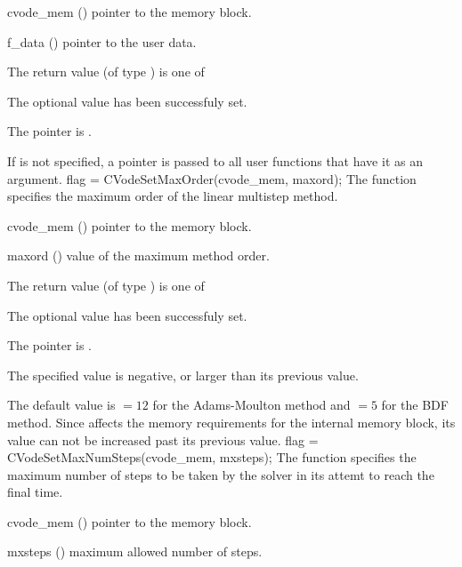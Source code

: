 {
  \begin{args}
  \item[cvode\_mem] ()
    pointer to the {\cvode} memory block.
  \item[f\_data] ()
    pointer to the user data.
  \end{args}
}
{
  The return value  (of type ) is one of
  \begin{args}
  \item[\Id{SUCCESS}] 
    The optional value has been successfuly set.
  \item[\Id{CVS\_NO\_MEM}]
    The  pointer is .
  \end{args}
}
{
  If  is not specified, a  pointer is
  passed to all user functions that have it as an argument.
}
{
flag = CVodeSetMaxOrder(cvode\_mem, maxord);
}
{
  The function  specifies the maximum order of the 
  linear multistep method.
}
{
  \begin{args}
  \item[cvode\_mem] ()
    pointer to the {\cvode} memory block.
  \item[maxord] ()
    value of the maximum method order.
  \end{args}
}
{
  The return value  (of type ) is one of
  \begin{args}
  \item[\Id{SUCCESS}] 
    The optional value has been successfuly set.
  \item[\Id{CVS\_NO\_MEM}]
    The  pointer is .
  \item[\Id{CVS\_ILL\_INPUT}]
    The specified value  is negative, or larger than 
    its previous value.
  \end{args}
}
{
  The default value is $= 12$ for
  the Adams-Moulton method and $= 5$
  for the BDF method.
  Since  affects the memory requirements
  for the internal {\cvode} memory block, its value
  can not be increased past its previous value.
}
{
flag = CVodeSetMaxNumSteps(cvode\_mem, mxsteps);
}
{
  The function  specifies the maximum number
  of steps to be taken by the solver in its attemt to reach 
  the final time.
}
{
  \begin{args}
  \item[cvode\_mem] ()
    pointer to the {\cvode} memory block.
  \item[mxsteps] ()
    maximum allowed number of steps.
  \end{args}
}
